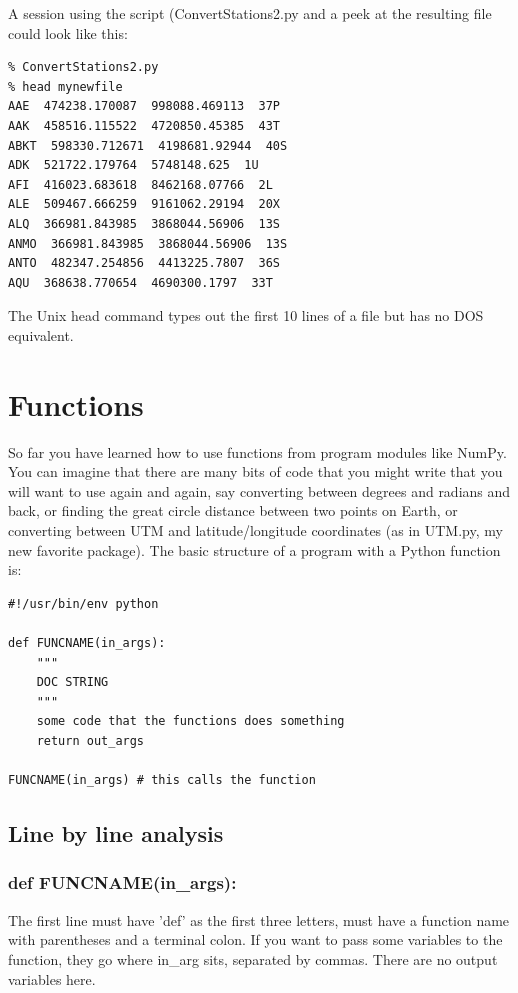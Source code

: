 \documentclass[11pt]{book}
\begin{document}
{\noindent A session using the script ({\color{blue}ConvertStations2.py} and a peek at the resulting file could look like this:
{ \color{blue} \begin{verbatim}
% ConvertStations2.py
% head mynewfile 
AAE  474238.170087  998088.469113  37P
AAK  458516.115522  4720850.45385  43T
ABKT  598330.712671  4198681.92944  40S
ADK  521722.179764  5748148.625  1U
AFI  416023.683618  8462168.07766  2L
ALE  509467.666259  9161062.29194  20X
ALQ  366981.843985  3868044.56906  13S
ANMO  366981.843985  3868044.56906  13S
ANTO  482347.254856  4413225.7807  36S
AQU  368638.770654  4690300.1797  33T
\end{verbatim}}

\noindent The Unix {\color{blue}head} command types out the first 10 lines of a file but has no DOS equivalent. 


\section{Functions}

So far you have learned how to use functions from program modules like {\color{blue}NumPy}.  You can imagine that there are many bits of code that you might write that you will want to use again and again, say converting between degrees and radians and back, or finding the great circle distance between two points on Earth, or converting between UTM and latitude/longitude coordinates (as in {\color{blue}UTM.py}, my new favorite package).      The basic structure of a program with a  Python function is: 


{ \color{blue} \begin{verbatim}
#!/usr/bin/env python

def FUNCNAME(in_args):  
    """
    DOC STRING
    """
    some code that the functions does something
    return out_args
    
FUNCNAME(in_args) # this calls the function
\end{verbatim}}



\subsection{Line by line analysis}
\subsubsection{def FUNCNAME(in\_args):}

\noindent The first line must have 'def' as the first three letters, must have a function name with parentheses and a terminal colon.  If you want to pass some variables to the function, they go where  in\_arg sits, separated by commas.  There are no output variables here.  

}
\end{document}
